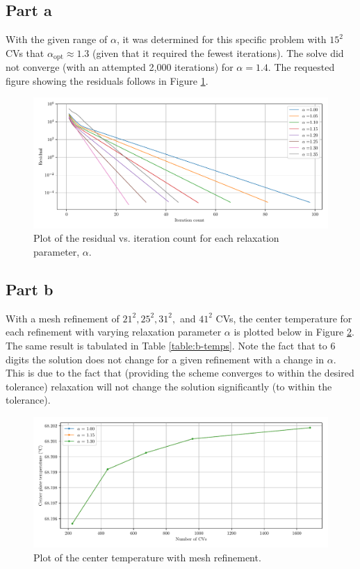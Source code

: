 \documentclass{article}
\begin{document}
\subsection*{Part a}

With the given range of $\alpha$, it was determined for this specific problem with $15^2$ CVs that $\alpha_\text{opt} \approx 1.3$ (given that it required the fewest iterations). The solve did not converge (with an attempted 2,000 iterations) for $\alpha = 1.4$. The requested figure showing the residuals follows in Figure \ref{fig:a}.

\begin{figure}[H]
	\centering
	\includegraphics[width=\linewidth]{../results/a}
	\caption{Plot of the residual vs. iteration count for each relaxation parameter, $\alpha$.}
	\label{fig:a}
\end{figure}

\subsection*{Part b}

With a mesh refinement of $21^2, 25^2, 31^2,$ and $41^2$ CVs, the center temperature for each refinement with varying relaxation parameter $\alpha$ is plotted below in Figure \ref{fig:b-temps}. The same result is tabulated in Table \ref{table:b-temps}. Note the fact that to 6 digits the solution does not change for a given refinement with a change in $\alpha$. This is due to the fact that (providing the scheme converges to within the desired tolerance) relaxation will not change the solution significantly (to within the tolerance).

\begin{figure}[H]
	\centering
	\includegraphics[width=\linewidth]{../results/b-temps}
	\caption{Plot of the center temperature with mesh refinement.}
	\label{fig:b-temps}
\end{figure}
\end{document}
